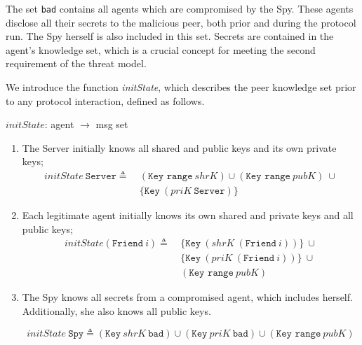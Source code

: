 The set \texttt{bad} contains all agents which are compromised by the Spy. These agents disclose all their secrets to the malicious peer, both prior and during the protocol run. The Spy herself is also included in this set. Secrets are contained in the agent's knowledge set, which is a crucial concept for meeting the second requirement of the threat model.

We introduce the function \textit{initState}, which describes the peer knowledge set prior to any protocol interaction, defined as follows.

\begin{center}
  {\ttfamily \(initState\): agent \(\longrightarrow \) msg set}
\end{center}

\begin{enumerate}
  \item The Server initially knows all shared and public keys and its own private keys;
  \begin{equation*}
    \begin{split}
      initState\ \texttt{Server} \triangleq\
      & (\texttt{Key range}\ shrK) \cup (\texttt{Key range}\ pubK)\ \cup \\
      & \{\texttt{Key}\ (priK\ \texttt{Server})\}
    \end{split}
  \end{equation*}
  \item Each legitimate agent initially knows its own shared and private keys and all public keys;
  \begin{equation*}
    \begin{split}
      initState (\texttt{Friend}\ \textit{i}) \triangleq\
      & \{ \texttt{Key}\ (shrK\ (\texttt{Friend}\ i))\}\ \cup \\
      & \{ \texttt{Key}\ (priK\ (\texttt{Friend}\ i))\}\ \cup \\
      & (\texttt{Key range}\ pubK)
    \end{split}
  \end{equation*}
  \item The Spy knows all secrets from a compromised agent, which includes herself. Additionally, she also knows all public keys.
  \begin{center}
    \[
      initState\ \texttt{Spy} \triangleq (\texttt{Key}\ shrK\ \texttt{bad}) \cup (\texttt{Key}\ priK\ \texttt{bad}) \cup (\texttt{Key range}\ pubK)
    \]
  \end{center}
\end{enumerate}

